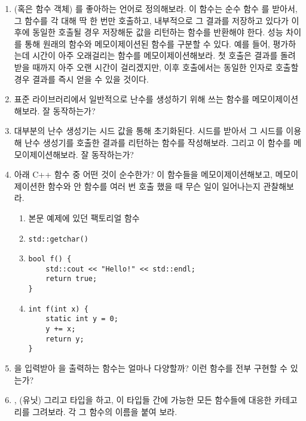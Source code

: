 \begin{enumerate}
\tightlist
\item
  \trHigherOrderFunction (혹은 함수 객체) 를 좋아하는 언어로 정의해보라.
  이 함수는 순수 함수 를 \trArgument\로 받아서, 그 함수를 각  대해 딱 한 번만 호출하고, 내부적으로 그 결과를 저장하고 있다가 이후에 동일한 \trArgument\로 호출될 경우 저장해둔 값을 리턴하는 함수를 반환해야 한다.
  성능 차이를 통해 원래의 함수와 메모이제이션된 함수를 구분할 수 있다. 예를 들어, 평가하는데 시간이 아주 오래걸리는 함수를 메모이제이션해보라.
  첫 호출은 결과를 돌려받을 때까지 아주 오랜 시간이 걸리겠지만, 이후 호출에서는 동일한 인자로 호출할 경우 결과를 즉시 얻을 수 있을 것이다.
\item
  표준 라이브러리에서 일반적으로 난수를 생성하기 위해 쓰는 함수를 메모이제이션해보라. 잘 동작하는가?
\item
  대부분의 난수 생성기는 시드 값을 통해 초기화된다. 시드를 받아서 그 시드를 이용해 난수 생성기를 호출한 결과를 리턴하는 함수를 작성해보라. 그리고 이 함수를 메모이제이션해보라. 잘 동작하는가?
\item
  아래 C++ 함수 중 어떤 것이 순수한가? 이 함수들을 메모이제이션해보고, 메모이제이션한 함수와 안 함수를 여러 번 호출 했을 때 무슨 일이 일어나는지 관찰해보라. 

  \begin{enumerate}
  \tightlist
  \item
    본문 예제에 있던 팩토리얼 함수
  \item
\begin{verbatim}
std::getchar()
\end{verbatim}
  \item
\begin{verbatim}
bool f() { 
    std::cout << "Hello!" << std::endl;
    return true;
}
\end{verbatim}
  \item
\begin{verbatim}
int f(int x) {
    static int y = 0;
    y += x;
    return y;
}
\end{verbatim}
  \end{enumerate}
\item
  을 입력받아 을 출력하는 함수는 얼마나 다양할까? 이런 함수를 전부 구현할 수 있는가?
\item
  , \code{()} (유닛) 그리고  타입을 \trObject\로 하고, 이 타입들 간에 가능한 모든 함수들에 \trArrow\를 대응한 카테고리를 그려보라. 각  그 함수의 이름을 붙여 보라.
\end{enumerate}
